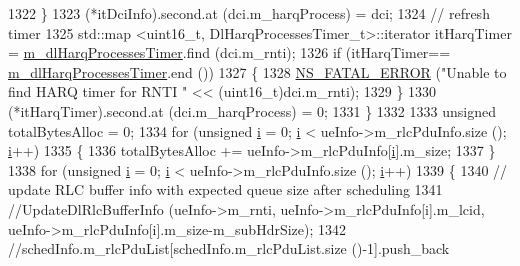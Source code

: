 \begin{DoxyCode}
1322                                 \}
1323                                 (*itDciInfo).second.at (dci.m\_harqProcess) = dci;
1324                                 \textcolor{comment}{// refresh timer}
1325                                 std::map <uint16\_t, DlHarqProcessesTimer\_t>::iterator itHarqTimer =  
      \hyperlink{classns3_1_1MmWaveFlexTtiMaxWeightMacScheduler_a60826192a5d859c1a1bb20955b3ad981}{m\_dlHarqProcessesTimer}.find (dci.m\_rnti);
1326                                 \textcolor{keywordflow}{if} (itHarqTimer== \hyperlink{classns3_1_1MmWaveFlexTtiMaxWeightMacScheduler_a60826192a5d859c1a1bb20955b3ad981}{m\_dlHarqProcessesTimer}.end ())
1327                                 \{
1328                                         \hyperlink{group__fatal_ga5131d5e3f75d7d4cbfd706ac456fdc85}{NS\_FATAL\_ERROR} (\textcolor{stringliteral}{"Unable to find HARQ timer for RNTI "}
       << (uint16\_t)dci.m\_rnti);
1329                                 \}
1330                                 (*itHarqTimer).second.at (dci.m\_harqProcess) = 0;
1331                         \}
1332 
1333                         \textcolor{keywordtype}{unsigned} totalBytesAlloc = 0;
1334                         \textcolor{keywordflow}{for} (\textcolor{keywordtype}{unsigned} \hyperlink{bernuolliDistribution_8m_a6f6ccfcf58b31cb6412107d9d5281426}{i} = 0; \hyperlink{bernuolliDistribution_8m_a6f6ccfcf58b31cb6412107d9d5281426}{i} < ueInfo->m\_rlcPduInfo.size (); 
      \hyperlink{bernuolliDistribution_8m_a6f6ccfcf58b31cb6412107d9d5281426}{i}++)
1335                         \{
1336                                 totalBytesAlloc += ueInfo->m\_rlcPduInfo[\hyperlink{bernuolliDistribution_8m_a6f6ccfcf58b31cb6412107d9d5281426}{i}].m\_size;
1337                         \}
1338                         \textcolor{keywordflow}{for} (\textcolor{keywordtype}{unsigned} \hyperlink{bernuolliDistribution_8m_a6f6ccfcf58b31cb6412107d9d5281426}{i} = 0; \hyperlink{bernuolliDistribution_8m_a6f6ccfcf58b31cb6412107d9d5281426}{i} < ueInfo->m\_rlcPduInfo.size (); 
      \hyperlink{bernuolliDistribution_8m_a6f6ccfcf58b31cb6412107d9d5281426}{i}++)
1339                         \{
1340                                 \textcolor{comment}{// update RLC buffer info with expected queue size after scheduling}
1341                                 \textcolor{comment}{//UpdateDlRlcBufferInfo (ueInfo->m\_rnti, ueInfo->m\_rlcPduInfo[i].m\_lcid,
       ueInfo->m\_rlcPduInfo[i].m\_size-m\_subHdrSize);}
1342                                 \textcolor{comment}{//schedInfo.m\_rlcPduList[schedInfo.m\_rlcPduList.size ()-1].push\_back
}
\end{DoxyCode}
